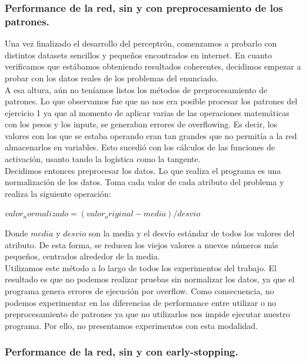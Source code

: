 \subsubsection{Performance de la red, sin y con preprocesamiento de los patrones.}

Una vez finalizado el desarrollo del perceptrón, comenzamos a probarlo con distintos datasets sencillos y pequeños encontrados en internet. En cuanto verificamos que estábamos obteniendo resultados coherentes, decidimos empezar a probar con los datos reales de los problemas del enunciado.\\

A esa altura, aún no teníamos listos los métodos de preprocesamiento de patrones. Lo que observamos fue que no nos era posible procesar los patrones del ejercicio 1 ya que al momento de aplicar varias de las operaciones matemáticas con los pesos y los inputs, se generaban errores de overflowing. Es decir, los valores con los que se estaba operando eran tan grandes que no permitía a la red almacenarlos en variables. Esto sucedió con los cálculos de las funciones de activación, usanto tando la logística como la tangente.\\

Decidimos entonces preprocesar los datos. Lo que realiza el programa es una normalización de los datos. Toma cada valor de cada atributo del problema y realiza 
la siguiente operación:\\

\begin{center}
	$valor_normalizado = (valor_original - media) / desvio$
\end{center}

Donde $media$ y $desvio$ son la media y el desvío estándar de todos los valores del atributo. De esta forma, se reducen los viejos valores a nuevos números más pequeños, centrados alrededor de la media.\\

Utilizamos este método a lo largo de todos los experimentos del trabajo. El resultado es que no podemos realizar pruebas sin normalizar los datos, ya que el programa genera errores de ejecución por overflow. Como consecuencia, no podemos experimentar en las diferencias de performance entre utilizar o no preprocesamiento de patrones ya que no utilizarlos nos impide ejecutar nuestro programa. Por ello, no presentamos experimentos con esta modalidad.

\subsubsection{Performance de la red, sin y con early-stopping.}

